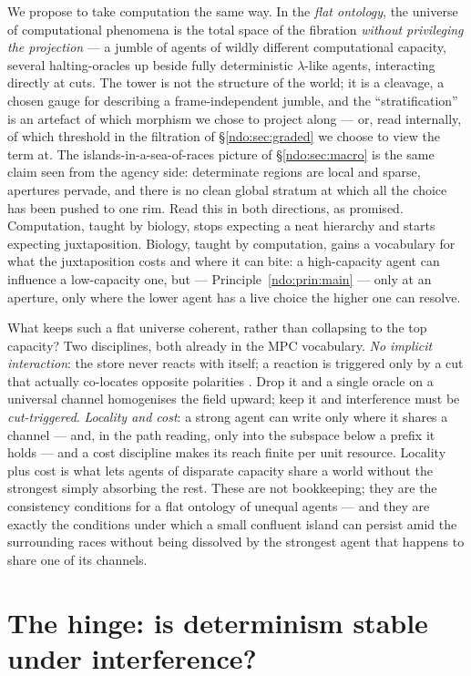 We propose to take computation the same way. In the \emph{flat ontology}, the universe
of computational phenomena is the total space of the fibration \emph{without privileging
the projection} --- a jumble of agents of wildly different computational capacity,
several halting-oracles up beside fully deterministic $\lambda$-like agents,
interacting directly at cuts. The tower is not the structure of the world; it is a
cleavage, a chosen gauge for describing a frame-independent jumble, and the
``stratification'' is an artefact of which morphism we chose to project along --- or, read
internally, of which threshold in the filtration of \S\ref{ndo:sec:graded} we choose to view the term
at. The
islands-in-a-sea-of-races picture of \S\ref{ndo:sec:macro} is the same claim seen from the
agency side: determinate regions are local and sparse, apertures pervade, and there is no
clean global stratum at which all the choice has been pushed to one rim. Read this in
both directions, as promised. Computation, taught by biology, stops expecting a neat
hierarchy and starts expecting juxtaposition. Biology, taught by computation, gains a
vocabulary for what the juxtaposition costs and where it can bite: a high-capacity agent
can influence a low-capacity one, but --- Principle~\ref{ndo:prin:main} --- only at an
aperture, only where the lower agent has a live choice the higher one can resolve.

What keeps such a flat universe coherent, rather than collapsing to the top capacity?
Two disciplines, both already in the MPC vocabulary. \emph{No implicit interaction}: the
store never reacts with itself; a reaction is triggered only by a cut that actually
co-locates opposite polarities \cite{paths}. Drop it and a single oracle on a universal
channel homogenises the field upward; keep it and interference must be \emph{cut-triggered}.
\emph{Locality and cost}: a strong agent can write only where it shares a channel ---
and, in the path reading, only into the subspace below a prefix it holds --- and a cost
discipline makes its reach finite per unit resource. Locality plus cost is what lets
agents of disparate capacity share a world without the strongest simply absorbing the
rest. These are not bookkeeping; they are the consistency conditions for a flat ontology
of unequal agents --- and they are exactly the conditions under which a small confluent
island can persist amid the surrounding races without being dissolved by the strongest
agent that happens to share one of its channels.


\section{The hinge: is determinism stable under interference?}\label{ndo:sec:crux}

